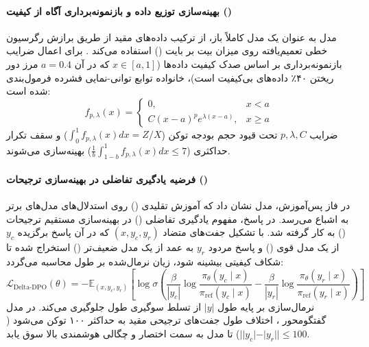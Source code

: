 \item {}

\paragraph*{بهینه‌سازی توزیع داده و بازنمونه‌برداری آگاه از کیفیت ()}
مدل  به عنوان یک مدل کاملاً باز، از ترکیب داده‌های مقید از طریق برازش رگرسیون خطی تعمیم‌یافته روی میزان بیت بر بایت () استفاده می‌کند \cite{olmo2025v3}. برای اعمال ضرایب بازنمونه‌برداری بر اساس صدک کیفیت داده‌ها ($x \in [a, 1]$ که در آن $a=0.4$ مرز دور ریختن ۴۰٪ داده‌های بی‌کیفیت است)، خانواده توابع توانی-نمایی فشرده فرمول‌بندی شده است:
\begin{equation}
    f_{p, \lambda}(x) = \begin{cases} 
        0, & x < a \\ 
        C(x-a)^p e^{\lambda(x-a)}, & x \ge a 
    \end{cases}
\end{equation}
ضرایب $p, \lambda, C$ تحت قیود حجم بودجه توکن ($\int_0^1 f_{p,\lambda}(x) dx = Z/X$) و سقف تکرار حداکثری ($\frac{1}{b}\int_{1-b}^1 f_{p,\lambda}(x) dx \le 7$) بهینه‌سازی می‌شوند.

\paragraph*{فرضیه یادگیری تفاضلی در بهینه‌سازی ترجیحات ()}
در فاز پس‌آموزش، مدل  نشان داد که آموزش تقلیدی () روی استدلال‌های مدل‌های برتر به اشباع می‌رسد. در پاسخ، مفهوم یادگیری تفاضلی () \cite{geng2025delta} در بهینه‌سازی مستقیم ترجیحات () \cite{rafailov2024direct} به کار گرفته شد. با تشکیل جفت‌های متضاد $(x, y_c, y_r)$ که در آن پاسخ برگزیده $y_c$ از یک مدل قوی () و پاسخ مردود $y_r$ به عمد از یک مدل ضعیف‌تر () استخراج شده تا شکاف کیفیتی بیشینه شود، زیان  نرمال‌شده بر طول محاسبه می‌گردد:
\begin{equation}
    \mathcal{L}_{\text{Delta-DPO}}(\theta) = -\mathbb{E}_{(x, y_c, y_r)} \left[ \log \sigma \left( \frac{\beta}{|y_c|} \log \frac{\pi_\theta(y_c \mid x)}{\pi_{\text{ref}}(y_c \mid x)} - \frac{\beta}{|y_r|} \log \frac{\pi_\theta(y_r \mid x)}{\pi_{\text{ref}}(y_r \mid x)} \right) \right]
\end{equation}
نرمال‌سازی بر پایه طول $|y|$ از تسلط سوگیری طول جلوگیری می‌کند. در مدل گفتگومحور ، اختلاف طول جفت‌های ترجیحی مقید به حداکثر ۱۰۰ توکن می‌شود ($||y_c| - |y_r|| \le 100$) تا مدل به سمت اختصار و چگالی هوشمندی بالا سوق یابد.

